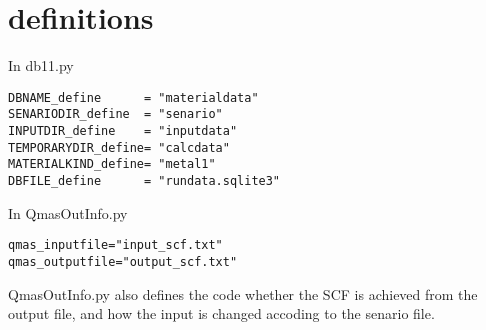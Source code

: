 \documentclass[a4paper]{article}
\begin{document}
\appendix
\section{definitions}

In db11.py
\begin{verbatim}
DBNAME_define      = "materialdata"
SENARIODIR_define  = "senario"
INPUTDIR_define    = "inputdata"
TEMPORARYDIR_define= "calcdata"
MATERIALKIND_define= "metal1"
DBFILE_define      = "rundata.sqlite3"
\end{verbatim}

In QmasOutInfo.py
\begin{verbatim}
qmas_inputfile="input_scf.txt"
qmas_outputfile="output_scf.txt"
\end{verbatim}
QmasOutInfo.py also defines the code whether the SCF is achieved from the output file, and how the input is changed accoding to the senario file.
\end{document}
